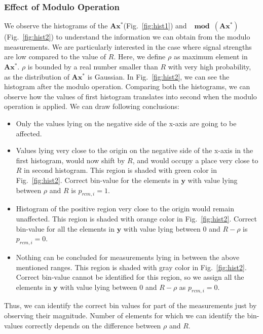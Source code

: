 \subsubsection{Effect of Modulo Operation} 
We observe the histograms of the $\mathbf{Ax^*}$(Fig.~\ref{fig:hist1}) and $\mathbf{\mod(\mathbf{Ax^*})}$(Fig.~\ref{fig:hist2}) to understand the information we can obtain from the modulo measurements. We are particularly interested in the case where signal strengths are low compared to the value of $R$. Here, we define $\rho$ as maximum element in $\mathbf{Ax^*}$. $\rho$ is bounded by a real number smaller than $R$ with very high probability, as the distribution of $\mathbf{Ax^*}$ is Gaussian.
In Fig.~\ref{fig:hist2}, we can see the histogram after the modulo operation. Comparing both the histograms, we can observe how the values of first histogram translates into second when the modulo operation is applied. We can draw following conclusions:
\begin{itemize}
	\item Only the values lying on the negative side of the x-axis are going to be affected.
	\item Values lying very close to the origin on the negative side of the x-axis in the first histogram, would now shift by $R$, and would occupy a place very close to $R$ in second histogram. This region is shaded with green color in Fig.~\ref{fig:hist2}. Correct bin-value for the elements in $\mathbf{y}$ with value lying between $\rho$ and $R$ is $p_{rcm,i} = 1$.
	\item Histogram of the positive region very close to the origin would remain unaffected. This region is shaded with orange color in Fig.~\ref{fig:hist2}. Correct bin-value for all the elements in $\mathbf{y}$ with value lying between $0$ and $R-\rho$ is $p_{rcm,i} = 0$.
	\item Nothing can be concluded for measurements lying in between the above mentioned ranges. This region is shaded with gray color in Fig.~\ref{fig:hist2}. Correct bin-value cannot be identified for this region, so we assign all the elements in $\mathbf{y}$ with value lying between $0$ and $R-\rho$ as $p_{rcm,i} = 0$.
\end{itemize}
Thus, we can identify the correct bin values for part of the measurements just by observing their magnitude. Number of elements for which we  can identify the bin-values correctly depends on the difference between $\rho$ and $R$.
